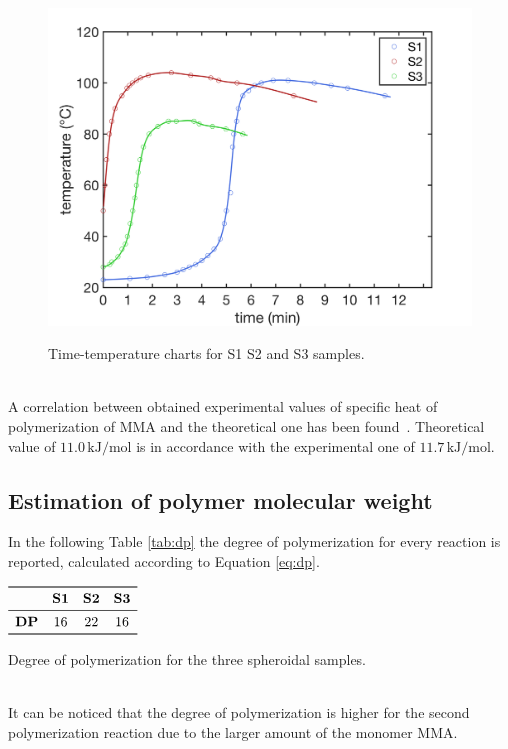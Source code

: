 \documentclass[a4paper, 11pt]{article}
\begin{document}
\begin{figure}[htp]
\centering
{\includegraphics[scale=0.35]{heatrelease}}
\captionsetup{justification=centering}
\caption{Time-temperature charts for S1 S2 and S3 samples.}
\label{fig:Tt}
\end{figure}\\
A correlation between obtained experimental values of specific heat of polymerization of MMA and the theoretical one has been found~\cite{link0}. Theoretical value of $11.0 \,\text{kJ}/\text{mol}$ is in accordance with the experimental one of $11.7 \,\text{kJ}/\text{mol}$. 

\subsection{Estimation of polymer molecular weight}

In the following Table \ref{tab:dp} the degree of polymerization for every reaction is reported, calculated according to Equation \ref{eq:dp}.
\begin{table}[htp]
\centering
$
\begin{array}{cccc}
\toprule
& \textbf{S1} & \textbf{S2} & \textbf{S3}  \\
\midrule
\textbf{DP} & 16 & 22 & 16 \\
\bottomrule
\end{array}
$
\caption{Degree of polymerization for the three spheroidal samples.}
\label{tab:dp}
\end{table}\\
It can be noticed that the degree of polymerization is higher for the second polymerization reaction due to the larger amount of the monomer MMA.
\end{document}
